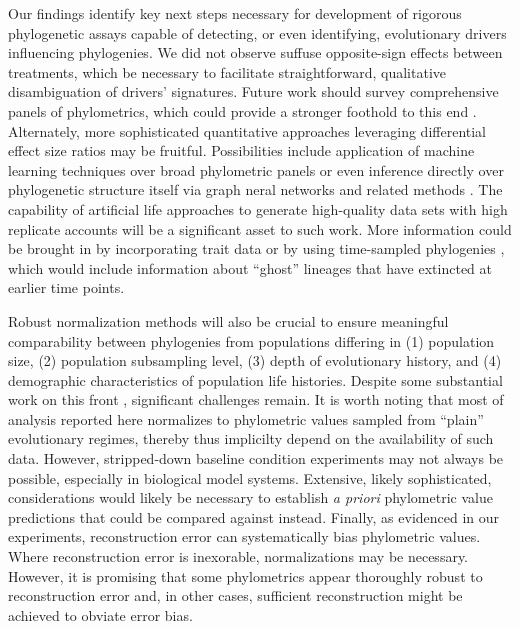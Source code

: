 Our findings identify key next steps necessary for development of rigorous phylogenetic assays capable of detecting, or even identifying, evolutionary drivers influencing phylogenies.
We did not observe suffuse opposite-sign effects between treatments, which be necessary to facilitate straightforward, qualitative disambiguation of drivers' signatures.
Future work should survey comprehensive panels of phylometrics, which could provide a stronger foothold to this end \citep{tuckerGuidePhylogeneticMetrics2017}.
Alternately, more sophisticated quantitative approaches leveraging differential effect size ratios may be fruitful.
Possibilities include application of machine learning techniques over broad phylometric panels \citep{voznica2022deep} or even inference directly over phylogenetic structure itself via graph neral networks and related methods \citep{lajaaiti2023comparison}.
The capability of artificial life approaches to generate high-quality data sets with high replicate accounts will be a significant asset to such work.
More information could be brought in by incorporating trait data \citep{nozoe2017inferring} or by using time-sampled phylogenies \citep{volz2013viral}, which would include information about ``ghost'' lineages that have extincted at earlier time points.

Robust normalization methods will also be crucial to ensure meaningful comparability between phylogenies from populations differing in (1) population size, (2) population subsampling level, (3) depth of evolutionary history, and (4) demographic characteristics of population life histories.
Despite some substantial work on this front \citep{shao1990tree,mir2018sound}, significant challenges remain.
It is worth noting that most of analysis reported here normalizes to phylometric values sampled from ``plain'' evolutionary regimes, thereby thus implicilty depend on the availability of such data.
However, stripped-down baseline condition experiments may not always be possible, especially in biological model systems.
Extensive, likely sophisticated, considerations would likely be necessary to establish \textit{a priori} phylometric value predictions that could be compared against instead.
Finally, as evidenced in our experiments, reconstruction error can systematically bias phylometric values.
Where reconstruction error is inexorable, normalizations may be necessary.
However, it is promising that some phylometrics appear thoroughly robust to reconstruction error and, in other cases, sufficient reconstruction might be achieved to obviate error bias.

